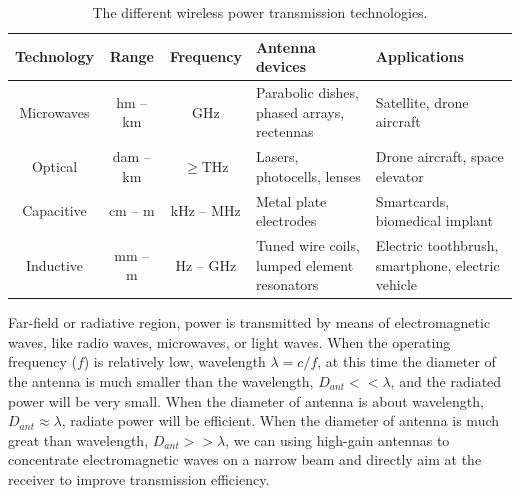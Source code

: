 \begin{table}[htbp]
    \centering
    \caption{The different wireless power transmission technologies.}
    \begin{tabular}{ |c|c|c|m{3.5cm}<{\centering}|m{3.5cm}<{\centering}| }
        \hline
        \textbf{Technology} & \textbf{Range} & \textbf{Frequency}         & \textbf{Antenna devices}                    & \textbf{Applications}                             \\\hline
Microwaves          & hm – km        & GHz                        & Parabolic dishes, phased arrays, rectennas  & Satellite, drone aircraft                         \\ \hline
Optical             & dam – km
                    & $\geq$THz      & Lasers, photocells, lenses & Drone aircraft, space elevator                                                                  \\ \hline
Capacitive          & cm – m         & kHz – MHz                  & Metal plate electrodes                      & Smartcards, biomedical implant
\\ \hline
Inductive           & mm – m         & Hz – GHz                   & Tuned wire coils, lumped element resonators & Electric toothbrush, smartphone, electric vehicle
\\ \hline
    \end{tabular}
    \label{table:differentWPT}
\end{table}
Far-field or radiative region, power is transmitted by means of electromagnetic waves, like radio waves, microwaves, or light waves. When the operating frequency ($f$) is relatively low, wavelength $\lambda = c/f$, at this time the diameter of the antenna is much smaller than the wavelength, $D_{ant} << \lambda$, and the radiated power will be very small. When the diameter of antenna is about wavelength, $D_{ant} \approx \lambda$, radiate power will be efficient. When the diameter of antenna is much great than wavelength, $D_{ant} >> \lambda$, we can using high-gain antennas to concentrate electromagnetic waves on a narrow beam and directly aim at the receiver to improve transmission efficiency.

